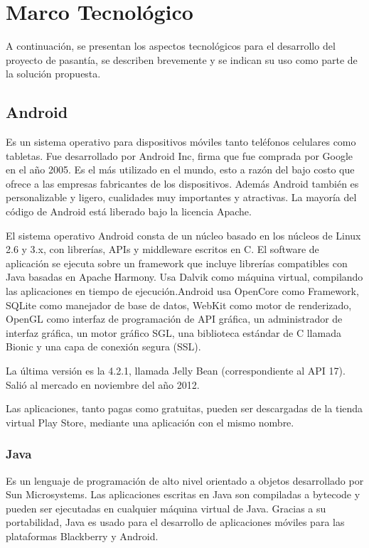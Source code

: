 
\chapter{Marco Tecnológico}

\thispagestyle{empty} 

A continuación, se presentan los aspectos tecnológicos para el desarrollo
del proyecto de pasantía, se describen brevemente y se indican su
uso como parte de la solución propuesta. 


\section{Android}

Es un sistema operativo para dispositivos móviles tanto teléfonos
celulares como tabletas. Fue desarrollado por Android Inc, firma que
fue comprada por Google en el año 2005. Es el más utilizado en el
mundo, esto a razón del bajo costo que ofrece a las empresas fabricantes
de los dispositivos. Además Android también es personalizable y ligero,
cualidades muy importantes y atractivas. La mayoría del código de
Android está liberado bajo la licencia Apache.

El sistema operativo Android consta de un núcleo basado en los núcleos
de Linux 2.6 y 3.x, con librerías, APIs y middleware escritos en C.
El software de aplicación se ejecuta sobre un framework que incluye
librerías compatibles con Java basadas en Apache Harmony. Usa Dalvik
como máquina virtual, compilando las aplicaciones en tiempo de ejecución.Android
usa OpenCore como Framework, SQLite como manejador de base de datos,
WebKit como motor de renderizado, OpenGL como interfaz de programación
de API gráfica, un administrador de interfaz gráfica, un motor gráfico
SGL, una biblioteca estándar de C llamada Bionic y una capa de conexión
segura (SSL).\cite{Cap4.Android}

La última versión es la 4.2.1, llamada Jelly Bean (correspondiente
al API 17). Salió al mercado en noviembre del año 2012.

Las aplicaciones, tanto pagas como gratuitas, pueden ser descargadas
de la tienda virtual Play Store, mediante una aplicación con el mismo
nombre.


\subsection{Java}

Es un lenguaje de programación de alto nivel orientado a objetos desarrollado
por Sun Microsystems. Las aplicaciones escritas en Java son compiladas
a bytecode y pueden ser ejecutadas en cualquier máquina virtual de
Java. Gracias a su portabilidad, Java es usado para el desarrollo
de aplicaciones móviles para las plataformas Blackberry y Android.

